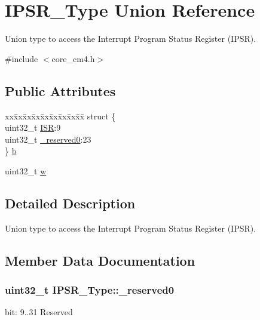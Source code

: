 \hypertarget{union_i_p_s_r___type}{}\section{I\+P\+S\+R\+\_\+\+Type Union Reference}
\label{union_i_p_s_r___type}


Union type to access the Interrupt Program Status Register (I\+P\+SR).  




{\ttfamily \#include $<$core\+\_\+cm4.\+h$>$}

\subsection*{Public Attributes}
\begin{DoxyCompactItemize}
\item 
\begin{tabbing}
xx\=xx\=xx\=xx\=xx\=xx\=xx\=xx\=xx\=\kill
struct \{\\
\>uint32\_t \hyperlink{union_i_p_s_r___type_ab46e5f1b2f4d17cfb9aca4fffcbb2fa5}{ISR}:9\\
\>uint32\_t \hyperlink{union_i_p_s_r___type_ad2eb0a06de4f03f58874a727716aa9aa}{\_reserved0}:23\\
\} \hyperlink{union_i_p_s_r___type_add0d6497bd50c25569ea22b48a03ec50}{b}\\

\end{tabbing}\item 
uint32\+\_\+t \hyperlink{union_i_p_s_r___type_a4adca999d3a0bc1ae682d73ea7cfa879}{w}
\end{DoxyCompactItemize}


\subsection{Detailed Description}
Union type to access the Interrupt Program Status Register (I\+P\+SR). 

\subsection{Member Data Documentation}
\subsubsection[{\texorpdfstring{\+\_\+reserved0}{_reserved0}}]{\setlength{\rightskip}{0pt plus 5cm}uint32\+\_\+t I\+P\+S\+R\+\_\+\+Type\+::\+\_\+reserved0}\hypertarget{union_i_p_s_r___type_ad2eb0a06de4f03f58874a727716aa9aa}{}\label{union_i_p_s_r___type_ad2eb0a06de4f03f58874a727716aa9aa}
bit\+: 9..31 Reserved 
